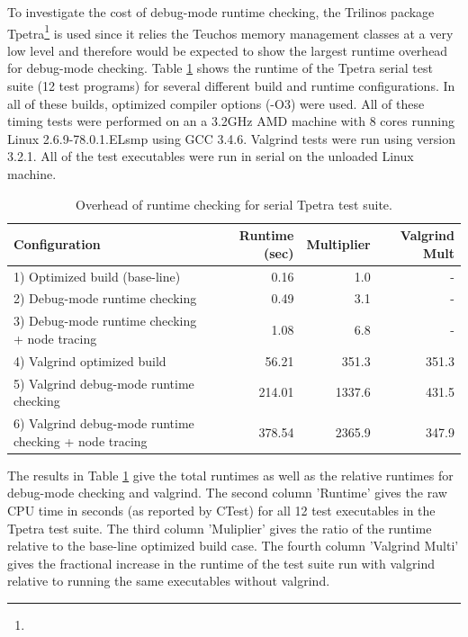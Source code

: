 \documentclass[pdf,ps2pdf,11pt]{SANDreport}
\begin{document}
To investigate the cost of debug-mode runtime checking, the Trilinos
package
Tpetra\footnote{{}}
is used since it relies the Teuchos memory management classes at a
very low level and therefore would be expected to show the largest
runtime overhead for debug-mode checking.  Table
{}\ref{tbl:overhead-of-runtime-checking} shows the runtime of the
Tpetra serial test suite (12 test programs) for several different
build and runtime configurations.  In all of these builds, optimized
compiler options (-O3) were used.  All of these timing tests were
performed on an a 3.2GHz AMD machine with 8 cores running Linux
2.6.9-78.0.1.ELsmp using GCC 3.4.6.  Valgrind tests were run using
version 3.2.1.  All of the test executables were run in serial on the
unloaded Linux machine.

\begin{table}
%
\begin{center}
%
{\small\begin{tabular}{|l|r|r|r|}
\hline
Configuration
& Runtime (sec)
& Multiplier
& Valgrind Mult \\
\hline
\hline
1) Optimized build (base-line)
& 0.16
& 1.0
& - \\
\hline
2) Debug-mode runtime checking
& 0.49
& 3.1
& - \\
\hline
3) Debug-mode runtime checking + node tracing
& 1.08
& 6.8
& - \\
\hline
4) Valgrind optimized build
& 56.21
& 351.3
& 351.3 \\
\hline
5) Valgrind debug-mode runtime checking
& 214.01
& 1337.6
& 431.5 \\
\hline
6) Valgrind debug-mode runtime checking + node tracing
& 378.54
& 2365.9
& 347.9 \\
\hline
\end{tabular}}
%
\end{center}
%
\caption{\label{tbl:overhead-of-runtime-checking}
Overhead of runtime checking for serial Tpetra test suite.}
%
\end{table}

The results in Table {}\ref{tbl:overhead-of-runtime-checking} give the
total runtimes as well as the relative runtimes for debug-mode
checking and valgrind.  The second column 'Runtime' gives the raw CPU
time in seconds (as reported by CTest) for all 12 test executables in
the Tpetra test suite.  The third column 'Muliplier' gives the ratio
of the runtime relative to the base-line optimized build case.  The
fourth column 'Valgrind Multi' gives the fractional increase in the
runtime of the test suite run with valgrind relative to running the
same executables without valgrind.
\end{document}
